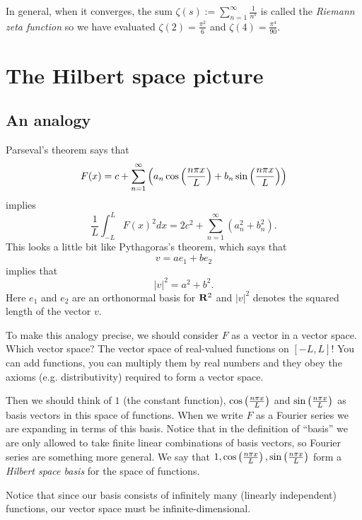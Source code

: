 In general, when it converges, the sum $\zeta(s):=\sum_{n=1}^{\infty}\frac{1}{n^s}$ is called the {\em Riemann zeta function} so we have evaluated $\zeta(2)=\frac{\pi^2}{6}$ and $\zeta(4)=\frac{\pi^4}{90}$.

\section{The Hilbert space picture}

\subsection{An analogy}

Parseval's theorem says that
\[F(x)=c+\sum_{n=1}^{\infty}\left(a_n\cos\left(\frac{n \pi x}{L}\right)+b_n\sin\left(\frac{n \pi x}{L}\right)\right)\]
implies
\[\frac{1}{L}\int_{-L}^LF(x)^2dx=2c^2+\sum_{n=1}^{\infty}(a^2_n+b^2_n).\]
This looks a little bit like Pythagoras's theorem, which says that
\[v=ae_1+be_2\]
implies that
\[|v|^2=a^2+b^2.\]
Here $e_1$ and $e_2$ are an orthonormal basis for $\mathbf{R}^2$ and $|v|^2$ denotes the squared length of the vector $v$.

To make this analogy precise, we should consider $F$ as a vector in a vector space. Which vector space? The vector space of real-valued functions on $[-L,L]$! You can add functions, you can multiply them by real numbers and they obey the axioms (e.g. distributivity) required to form a vector space.

Then we should think of $1$ (the constant function), $\cos\left(\frac{n \pi x}{L}\right)$ and $\sin\left(\frac{n \pi x}{L}\right)$ as basis vectors in this space of functions. When we write $F$ as a Fourier series we are expanding in terms of this basis. Notice that in the definition of ``basis'' we are only allowed to take finite linear combinations of basis vectors, so Fourier series are something more general. We say that $1,\cos\left(\frac{n \pi x}{L}\right),\sin\left(\frac{n \pi x}{L}\right)$ form a {\em Hilbert space basis} for the space of functions.

Notice that since our basis consists of infinitely many (linearly independent) functions, our vector space must be infinite-dimensional.

